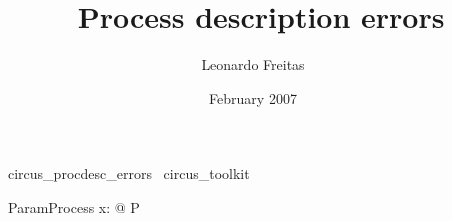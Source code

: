 \documentclass{article}
\begin{document}
\title{\Circus\ Process description errors}
\author{Leonardo Freitas}
\date{February 2007}

\maketitle

\begin{zsection}
  \SECTION\ circus\_procdesc\_errors \parents\ circus\_toolkit
\end{zsection}

\begin{circus}
    \circprocess\ ParamProcess \circdef x: \nat @ P
\end{circus}
\end{document}
